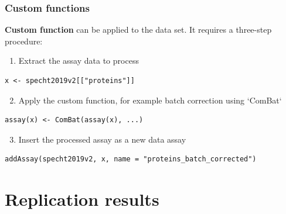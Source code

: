 \documentclass{beamer}
\newcommand{\frametitlesection}[1]{\frametitle{\centering #1 \footnotesize \hspace{0pt plus 1 filll} \insertsection}}
\begin{document}
\begin{frame}[fragile]
    \frametitlesection{Custom functions}
    
    \textbf{Custom function} can be applied to the data set. It requires a 
    three-step procedure:
    
    \begin{enumerate}
        \item Extract the assay data to process
    \end{enumerate}
    
    \begin{lstlisting}[basicstyle = \scriptsize\ttfamily\color{vdgray}]
x <- specht2019v2[["proteins"]]
    \end{lstlisting}
    
    \begin{enumerate}
        \setcounter{enumi}{1}
        \item Apply the custom function, for example batch correction using 
        `ComBat`
    \end{enumerate}
    
    \begin{lstlisting}[firstnumber=2,  basicstyle = \scriptsize\ttfamily\color{vdgray}]
assay(x) <- ComBat(assay(x), ...)
    \end{lstlisting}
    
    \begin{enumerate}
        \setcounter{enumi}{2}
        \item Insert the processed assay as a new data assay
    \end{enumerate}
    
    \begin{lstlisting}[firstnumber=3,  basicstyle = \scriptsize\ttfamily\color{vdgray}]
addAssay(specht2019v2, x, name = "proteins_batch_corrected")
    \end{lstlisting}
    
    
\end{frame}


\section{Replication results}
\end{document}
